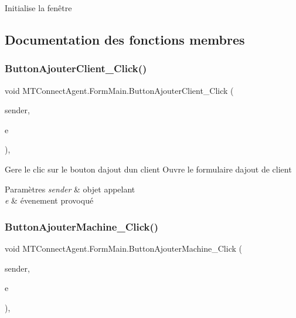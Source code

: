 Initialise la fenêtre 



\subsection{Documentation des fonctions membres}
\mbox{\label{class_m_t_connect_agent_1_1_form_main_a52a71c632c1f54d42d45e7220ed97923}} 
\subsubsection{\texorpdfstring{Button\+Ajouter\+Client\+\_\+\+Click()}{ButtonAjouterClient\_Click()}}
{\footnotesize\ttfamily void M\+T\+Connect\+Agent.\+Form\+Main.\+Button\+Ajouter\+Client\+\_\+\+Click (\begin{DoxyParamCaption}\item[{object}]{sender,  }\item[{Event\+Args}]{e }\end{DoxyParamCaption})\hspace{0.3cm}{\ttfamily [inline]}, {\ttfamily [private]}}



Gere le clic sur le bouton d\textquotesingle{}ajout d\textquotesingle{}un client Ouvre le formulaire d\textquotesingle{}ajout de client 


\begin{DoxyParams}{Paramètres}
{\em sender} & objet appelant\\
\hline
{\em e} & évenement provoqué\\
\hline
\end{DoxyParams}
\mbox{\label{class_m_t_connect_agent_1_1_form_main_aab7098479c86c56fc6b1bd57cc9fe7fc}} 
\subsubsection{\texorpdfstring{Button\+Ajouter\+Machine\+\_\+\+Click()}{ButtonAjouterMachine\_Click()}}
{\footnotesize\ttfamily void M\+T\+Connect\+Agent.\+Form\+Main.\+Button\+Ajouter\+Machine\+\_\+\+Click (\begin{DoxyParamCaption}\item[{object}]{sender,  }\item[{Event\+Args}]{e }\end{DoxyParamCaption})\hspace{0.3cm}{\ttfamily [inline]}, {\ttfamily [private]}}



